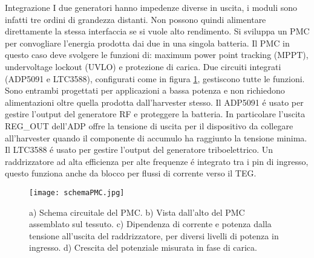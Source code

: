 \begin{section}{Integrazione}
    I due generatori hanno impedenze diverse in uscita, i moduli sono infatti tre ordini di grandezza distanti. Non possono quindi alimentare direttamente la stessa interfaccia se si vuole alto rendimento. Si sviluppa un PMC per convogliare l'energia prodotta dai due in una singola batteria. Il PMC in questo caso deve svolgere le funzioni di: maximum power point tracking (MPPT), undervoltage lockout (UVLO) e protezione di carica. Due circuiti integrati (ADP5091 e LTC3588), configurati come in figura \ref{fig:schemaPMC}, gestiscono tutte le funzioni. Sono entrambi progettati per applicazioni a bassa potenza e non richiedono alimentazioni oltre quella prodotta dall'harvester stesso. Il ADP5091 \'e usato per gestire l'output del generatore RF e proteggere la batteria. In particolare l'uscita REG\_OUT dell'ADP offre la tensione di uscita per il dispositivo da collegare all'harvester quando il componente di accumulo ha raggiunto la tensione minima. Il LTC3588 \'e usato per gestire l'output del generatore triboelettrico. Un raddrizzatore ad alta efficienza per alte frequenze \'e integrato  tra i pin di ingresso, questo funziona anche da blocco per flussi di corrente verso il TEG.

    \begin{figure}[hbt!]
        \texttt{[image: schemaPMC.jpg]}
        \centering
        \caption{a) Schema circuitale del PMC. b) Vista dall'alto del PMC assemblato sul tessuto. c) Dipendenza di corrente e potenza dalla tensione all'uscita del raddrizzatore, per diversi livelli di potenza in ingresso. d) Crescita del potenziale misurata in fase di carica.\cite{kouWearableAllFabricHybrid2024}}
        \label{fig:schemaPMC}
    \end{figure}


\end{section}

